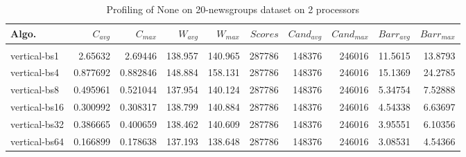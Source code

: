 \begin{table*}[htbp]
\centering
 \begin{tabular}{l r r r r r r r r r}
Algo. & $C_{avg}$ & $C_{max}$ & $W_{avg}$ & $W_{max}$ & $Scores$ & $Cand_{avg}$ & $Cand_{max}$ & $Barr_{avg}$ & $Barr_{max}$ \\
\hline \\
vertical-bs1 & 2.65632 & 2.69446 & 138.957 & 140.965 & 287786 & 148376 & 246016 & 11.5615 & 13.8793 \\
vertical-bs4 & 0.877692 & 0.882846 & 148.884 & 158.131 & 287786 & 148376 & 246016 & 15.1369 & 24.2785 \\
vertical-bs8 & 0.495961 & 0.521044 & 137.954 & 140.124 & 287786 & 148376 & 246016 & 5.34754 & 7.52888 \\
vertical-bs16 & 0.300992 & 0.308317 & 138.799 & 140.884 & 287786 & 148376 & 246016 & 4.54338 & 6.63697 \\
vertical-bs32 & 0.386665 & 0.400659 & 138.462 & 140.609 & 287786 & 148376 & 246016 & 3.95551 & 6.10356 \\
vertical-bs64 & 0.166899 & 0.178638 & 137.193 & 138.648 & 287786 & 148376 & 246016 & 3.08531 & 4.54366 \\
 
\end{tabular}
\caption{Profiling of None on 20-newsgroups dataset on 2 processors }
\label{tab:20-newsgroups:2}
\end{table*}
